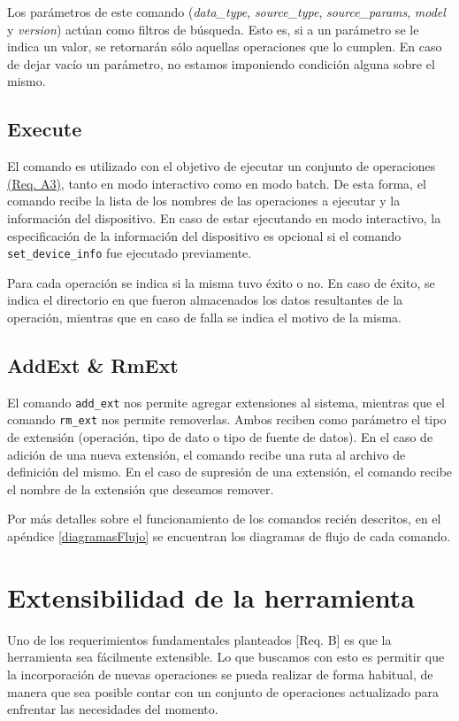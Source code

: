 Los parámetros de este comando (\emph{data\_type}, \emph{source\_type}, \emph{source\_params}, \emph{model} y \emph{version}) actúan como filtros de búsqueda. Esto es, si a un parámetro se le indica un valor, se retornarán sólo aquellas operaciones que lo cumplen. En caso de dejar vacío un parámetro, no estamos imponiendo condición alguna sobre el mismo.

\subsection*{Execute}
El comando es utilizado con el objetivo de ejecutar un conjunto de operaciones \hyperref[reqA3]{(Req. A3)}, tanto en modo interactivo como en modo batch. De esta forma, el comando recibe la lista de los nombres de las operaciones a ejecutar y la información del dispositivo. En caso de estar ejecutando en modo interactivo, la especificación de la información del dispositivo es opcional si el comando \texttt{set\_device\_info} fue ejecutado previamente.

Para cada operación se indica si la misma tuvo éxito o no. En caso de éxito, se indica el directorio en que fueron almacenados los datos resultantes de la operación, mientras que en caso de falla se indica el motivo de la misma.

\subsection*{AddExt \& RmExt}
El comando \texttt{add\_ext} nos permite agregar extensiones al sistema, mientras que el comando \texttt{rm\_ext} nos permite removerlas. Ambos reciben como parámetro el tipo de extensión (operación, tipo de dato o tipo de fuente de datos). En el caso de adición de una nueva extensión, el comando recibe una ruta al archivo de definición del mismo. En el caso de supresión de una extensión, el comando recibe el nombre de la extensión que deseamos remover.
\newline

Por más detalles sobre el funcionamiento de los comandos recién descritos, en el apéndice \ref{diagramasFlujo} se encuentran los diagramas de flujo de cada comando.

\section{Extensibilidad de la herramienta}
\label{extensibilidadDeLaHerramienta}
Uno de los requerimientos fundamentales planteados [Req. B] es que la herramienta sea fácilmente extensible. Lo que buscamos con esto es permitir que la incorporación de nuevas operaciones se pueda realizar de forma habitual, de manera que sea posible contar con un conjunto de operaciones actualizado para enfrentar las necesidades del momento.

